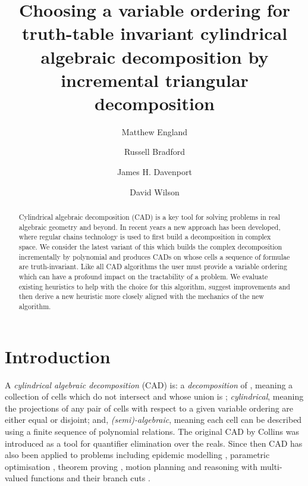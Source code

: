 \documentclass[runningheads,a4paper]{llncs}
\begin{document}
\mainmatter



\title{Choosing a variable ordering for truth-table invariant cylindrical algebraic decomposition by incremental triangular decomposition}   \author{Matthew England \and  Russell Bradford \and James H. Davenport \and David Wilson}
\maketitle



\begin{abstract}


Cylindrical algebraic decomposition (CAD) is a key tool for solving problems in real algebraic geometry and beyond.  In recent years a new approach has been developed, where regular chains technology is used to first build a decomposition in complex space.
We consider the latest variant of this which builds the complex decomposition incrementally by polynomial and produces CADs on whose cells a sequence of formulae are truth-invariant.  
Like all CAD algorithms the user must provide a variable ordering which can have a profound impact on the tractability of a problem.  We evaluate existing heuristics to help with the choice for this algorithm, suggest  improvements and then derive a new heuristic more closely aligned with the mechanics of the new algorithm.
\end{abstract}


\section{Introduction} 
\label{SEC:Intro}

A \textit{cylindrical algebraic decomposition} (CAD) is: a \textit{decomposition} of , meaning a collection of cells which do not intersect and whose union is ; \textit{cylindrical}, meaning the projections of any pair of cells with respect to a given variable ordering are either equal or disjoint; and, \textit{(semi)-algebraic}, meaning each cell can be described using a finite sequence of polynomial relations.
The original CAD by Collins \cite{ACM84I} was introduced as a tool for quantifier elimination over the reals.  Since then CAD has also been applied to problems including epidemic modelling \cite{BENW06}, parametric optimisation \cite{FPM05}, theorem proving \cite{Paulson2012}, motion planning \cite{WDEB14} and reasoning with multi-valued functions and their branch cuts \cite{DBEW12}.
\end{document}
